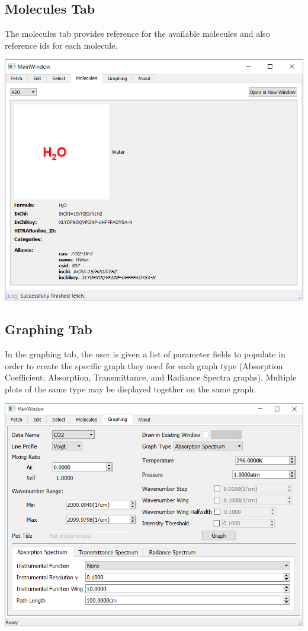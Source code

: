 \documentclass[12pt]{article}
\begin{document}
\subsection{Molecules Tab}
The molecules tab provides reference for the available molecules and also reference ids for each molecule.
\begin{center}
\includegraphics[scale = 0.6]{MainWindow_Molecules}
\end{center}

\subsection{Graphing Tab}
In the graphing tab, the user is given a list of parameter fields to populate in order to create the specific graph they need for each graph type (Absorption Coefficient; Absorption, Transmittance, and Radiance Spectra graphs). Multiple plots of the same type may be displayed together on the same graph.
\begin{center}
\includegraphics[scale = 0.6]{GraphingWindow}
\end{center}
\end{document}
